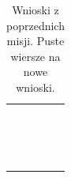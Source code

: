 \begin{longtable}{@{}P{27mm}>{\raggedright\arraybackslash}p{0.62\linewidth}P{12mm}@{}}
\rule{0pt}{7mm} & & \\\hline
\rule{0pt}{7mm} & & \\\hline
\rule{0pt}{7mm} & & \\\hline
\rule{0pt}{7mm} & & \\\hline
\rule{0pt}{7mm} & & \\\hline
\rule{0pt}{7mm} & & \\\hline
\rule{0pt}{7mm} & & \\\hline
\rule{0pt}{7mm} & & \\\hline
\rule{0pt}{7mm} & & \\\hline
\rule{0pt}{7mm} & & \\\hline
\rule{0pt}{7mm} & & \\\hline
\rule{0pt}{7mm} & & \\\hline
\rule{0pt}{7mm} & & \\\hline
\rule{0pt}{7mm} & & \\\hline
\rule{0pt}{7mm} & & \\\hline
\rule{0pt}{7mm} & & \\\hline
\caption{Wnioski z poprzednich misji. Puste wiersze na nowe wnioski.}\label{tab:wnioski}
\end{longtable}
